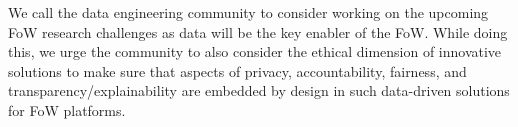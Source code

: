 \documentclass[11pt]{article}
\begin{document}
We call the data engineering community to consider working on the upcoming FoW research challenges as data will be the key enabler of the FoW. While doing this, we urge the community to also consider the ethical dimension of  innovative solutions to make sure that aspects of privacy, accountability, fairness, and transparency/explainability are embedded by design in such data-driven solutions for FoW platforms.



\end{document}
